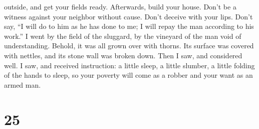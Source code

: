 outside, and get your fields ready. Afterwards, build your house.
 Don't be a witness against your neighbor without cause.
Don't deceive with your lips.  Don't say, ``I will do to
him as he has done to me; I will repay the man according to his work.''
 I went by the field of the sluggard, by the vineyard of
the man void of understanding.  Behold, it was all grown
over with thorns. Its surface was covered with nettles, and its stone
wall was broken down.  Then I saw, and considered well. I
saw, and received instruction:  a little sleep, a little
slumber, a little folding of the hands to sleep,  so your
poverty will come as a robber and your want as an armed man.

\hypertarget{section-20}{%
\section{25}\label{section-20}}

